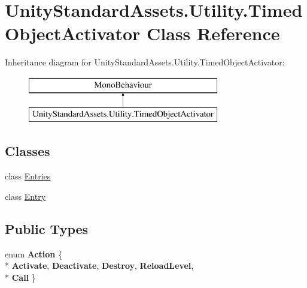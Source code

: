\hypertarget{class_unity_standard_assets_1_1_utility_1_1_timed_object_activator}{}\section{Unity\+Standard\+Assets.\+Utility.\+Timed\+Object\+Activator Class Reference}
\label{class_unity_standard_assets_1_1_utility_1_1_timed_object_activator}
Inheritance diagram for Unity\+Standard\+Assets.\+Utility.\+Timed\+Object\+Activator\+:\begin{figure}[H]
\begin{center}
\leavevmode
\includegraphics[height=2.000000cm]{class_unity_standard_assets_1_1_utility_1_1_timed_object_activator}
\end{center}
\end{figure}
\subsection*{Classes}
\begin{DoxyCompactItemize}
\item 
class \hyperlink{class_unity_standard_assets_1_1_utility_1_1_timed_object_activator_1_1_entries}{Entries}
\item 
class \hyperlink{class_unity_standard_assets_1_1_utility_1_1_timed_object_activator_1_1_entry}{Entry}
\end{DoxyCompactItemize}
\subsection*{Public Types}
\begin{DoxyCompactItemize}
\item 
enum {\bfseries Action} \{ \\*
{\bfseries Activate}, 
{\bfseries Deactivate}, 
{\bfseries Destroy}, 
{\bfseries Reload\+Level}, 
\\*
{\bfseries Call}
 \}\hypertarget{class_unity_standard_assets_1_1_utility_1_1_timed_object_activator_a4fd60b3607bc774ff633811e0b2b2090}{}\label{class_unity_standard_assets_1_1_utility_1_1_timed_object_activator_a4fd60b3607bc774ff633811e0b2b2090}

\end{DoxyCompactItemize}
